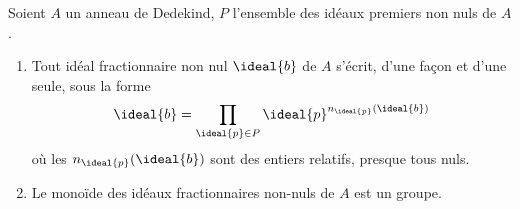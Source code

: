 \documentclass[11pt, %
  title in boldface,
  theorem in new line,
  theorem numbering = section,
  number theorems separately,
  simple name,
]{beaulivre}
\begin{document}
    \begin{theorem}\label{thm:propriétés d'anneaux de Dedekind}
        Soient \( A \) un anneau de Dedekind, \( P \) l'ensemble des idéaux premiers non nuls de \( A \).
        \begin{enumerate}
            \item \label{thm:propriétés d'anneaux de Dedekind;item1} Tout idéal fractionnaire non nul \( \ideal{b} \) de \( A \) s'écrit, d'une façon et d'une seule, sous la forme
            \begin{equation}\label{eq:factorisation d'un idéal fractionnaire}
                \ideal{b} = \prod_{\ideal{p} \in P} \ideal{p}^{n_{\ideal{p}}(\ideal{b})}
            \end{equation}
            où les \( n_{\ideal{p}}(\ideal{b}) \) sont des entiers relatifs, presque tous nuls.
            \item \label{thm:propriétés d'anneaux de Dedekind;item2} Le monoïde des idéaux fractionnaires non-nuls de \( A \) est un groupe.
        \end{enumerate}
    \end{theorem}
\end{document}
